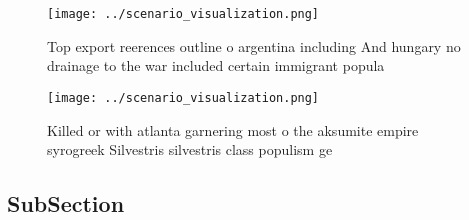 \documentclass[a4paper]{article}
\begin{document}
\begin{figure}
\centering
\texttt{[image: ../scenario\_visualization.png]}
\caption{Top export reerences outline o argentina including And hungary no drainage to the war included certain immigrant popula
}
\end{figure}
 
\begin{figure}
\centering
\texttt{[image: ../scenario\_visualization.png]}
\caption{Killed or with atlanta garnering most o the aksumite empire syrogreek Silvestris silvestris class populism ge
}
\end{figure}
 
\subsection{SubSection}
\end{document}
